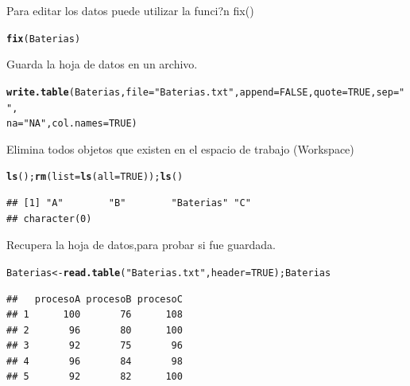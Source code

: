 \documentclass[10pt,a4paper]{article}\usepackage[]{graphicx}\usepackage[]{color}
\makeatletter
\newcommand{\hlnum}[1]{\textcolor[rgb]{0.686,0.059,0.569}{#1}}%
\newcommand{\hlstr}[1]{\textcolor[rgb]{0.192,0.494,0.8}{#1}}%
\newcommand{\hlstd}[1]{\textcolor[rgb]{0.345,0.345,0.345}{#1}}%
\newcommand{\hlkwb}[1]{\textcolor[rgb]{0.69,0.353,0.396}{#1}}%
\newcommand{\hlkwc}[1]{\textcolor[rgb]{0.333,0.667,0.333}{#1}}%
\newcommand{\hlkwd}[1]{\textcolor[rgb]{0.737,0.353,0.396}{\textbf{#1}}}%
\newenvironment{kframe}{%
 \def\at@end@of@kframe{}%
 \ifinner\ifhmode%
  \def\at@end@of@kframe{\end{minipage}}%
  \begin{minipage}{\columnwidth}%
 \fi\fi%
 \def\FrameCommand##1{\hskip\@totalleftmargin \hskip-\fboxsep
 \colorbox{shadecolor}{##1}\hskip-\fboxsep
     \hskip-\linewidth \hskip-\@totalleftmargin \hskip\columnwidth}%
 \MakeFramed {\advance\hsize-\width
   \@totalleftmargin\z@ \linewidth\hsize
   \@setminipage}}%
 {\par\unskip\endMakeFramed%
 \at@end@of@kframe}
\newenvironment{knitrout}{}{} %
\makeatother
\begin{document}
 Para editar los datos puede utilizar la funci?n fix() 
\begin{knitrout}
\color{fgcolor}\begin{kframe}
\begin{alltt}
\hlkwd{fix}\hlstd{(Baterias)}
\end{alltt}
\end{kframe}
\end{knitrout}

Guarda la hoja de datos en un archivo. 
\begin{knitrout}
\color{fgcolor}\begin{kframe}
\begin{alltt}
\hlkwd{write.table}\hlstd{(Baterias,} \hlkwc{file}\hlstd{=}\hlstr{"Baterias.txt"}\hlstd{,} \hlkwc{append}\hlstd{=}\hlnum{FALSE}\hlstd{,} \hlkwc{quote}\hlstd{=}\hlnum{TRUE}\hlstd{,} \hlkwc{sep}\hlstd{=}\hlstr{" "}\hlstd{,}
\hlkwc{na}\hlstd{=}\hlstr{"NA"}\hlstd{,} \hlkwc{col.names}\hlstd{=}\hlnum{TRUE}\hlstd{)}
\end{alltt}
\end{kframe}
\end{knitrout}

Elimina todos objetos que existen en el espacio de trabajo (Workspace) 
\begin{knitrout}
\color{fgcolor}\begin{kframe}
\begin{alltt}
\hlkwd{ls}\hlstd{();} \hlkwd{rm}\hlstd{(}\hlkwc{list}\hlstd{=}\hlkwd{ls}\hlstd{(}\hlkwc{all}\hlstd{=}\hlnum{TRUE}\hlstd{));} \hlkwd{ls}\hlstd{()}
\end{alltt}
\begin{verbatim}
## [1] "A"        "B"        "Baterias" "C"
## character(0)
\end{verbatim}
\end{kframe}
\end{knitrout}

Recupera la hoja de datos,para probar si fue guardada. 
\begin{knitrout}
\color{fgcolor}\begin{kframe}
\begin{alltt}
\hlstd{Baterias} \hlkwb{<-} \hlkwd{read.table}\hlstd{(}\hlstr{"Baterias.txt"}\hlstd{,} \hlkwc{header}\hlstd{=}\hlnum{TRUE}\hlstd{); Baterias}
\end{alltt}
\begin{verbatim}
##   procesoA procesoB procesoC
## 1      100       76      108
## 2       96       80      100
## 3       92       75       96
## 4       96       84       98
## 5       92       82      100
\end{verbatim}
\end{kframe}
\end{knitrout}
\end{document}
